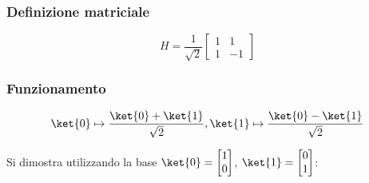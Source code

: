 \documentclass[a4paper]{article}
\begin{document}
\subsubsection{Definizione matriciale}

\begin{equation}
	H = \dfrac{1}{\sqrt{2}}
	\begin{bmatrix}
		1&1\\
		1&-1
	\end{bmatrix}
\end{equation}

\subsubsection{Funzionamento}

\begin{equation}
	\ket{0} \mapsto \dfrac{\ket{0} + \ket{1}}{\sqrt{2}}, \ket{1} \mapsto \dfrac{\ket{0} - \ket{1}}{\sqrt{2}}
\end{equation}

Si dimostra utilizzando la base $\ket{0} = 	\begin{bmatrix} 1 \\ 0 \end{bmatrix}$, $\ket{1} = \begin{bmatrix} 0 \\ 1 \end{bmatrix}$:
\end{document}
